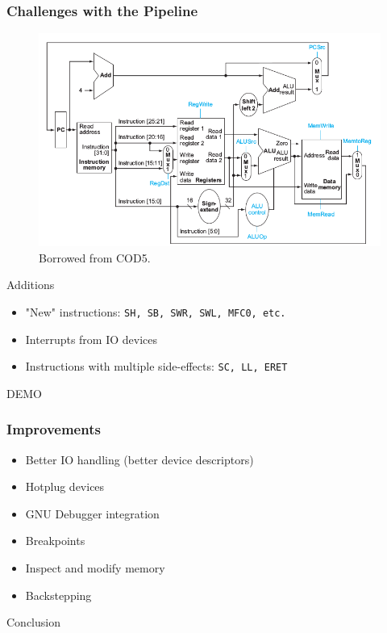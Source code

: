 \documentclass{beamer}
\begin{document}
\begin{frame}
\frametitle{Challenges with the Pipeline}

\begin{figure}
	\includegraphics[scale=0.23]{cpu.png}
	\caption{Borrowed from COD5.}
\end{figure}

\begin{block}{Additions}
\begin{itemize}
	\item "New" instructions: \texttt{SH, SB, SWR, SWL, MFC0, etc.}
	\pause
	\item Interrupts from IO devices
	\pause
	\item Instructions with multiple side-effects: \texttt{SC, LL, ERET}
\end{itemize}
\end{block}
\end{frame}



\begin{frame}
\begin{center}
DEMO
\end{center}
\end{frame}


\begin{frame}
\frametitle{Improvements}
	\begin{itemize}
		\item Better IO handling (better device descriptors)
		\item Hotplug devices
		\item GNU Debugger integration
		\item Breakpoints
		\item Inspect and modify memory
		\item Backstepping
	\end{itemize}
\end{frame}


\begin{frame}
\begin{center}
Conclusion
\end{center}

\end{frame}
\end{document}
